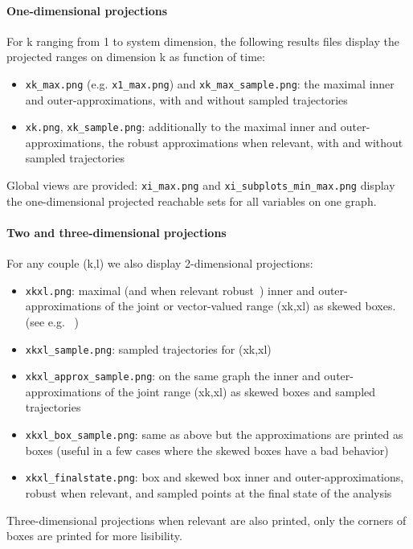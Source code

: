 \documentclass{article}
\begin{document}
\paragraph{One-dimensional projections}
For k ranging from 1 to system dimension, the following results files display the projected ranges on dimension k as function of time:
\begin{itemize}[noitemsep]
\item \texttt{xk\_max.png}  (e.g.  \texttt{x1\_max.png})  and \texttt{xk\_max\_sample.png}: the maximal inner and outer-approximations, with and without sampled trajectories
\item \texttt{xk.png},  \texttt{xk\_sample.png}: additionally to the maximal inner and outer-approximations, the robust approximations when relevant, with and without sampled trajectories
\end{itemize}
Global views are provided: \texttt{xi\_max.png} and \texttt{xi\_subplots\_min\_max.png} display the one-dimensional projected reachable sets for all variables on one graph. 

\paragraph{Two and three-dimensional projections}
For any couple (k,l) we also display 2-dimensional projections:
\begin{itemize}[noitemsep]
\item \texttt{xkxl.png}:  maximal (and when relevant robust~\cite{hscc19}) inner and outer-approximations of the joint or vector-valued range (xk,xl) as skewed boxes. (see e.g. ~\cite{lcss2020})
\item \texttt{xkxl\_sample.png}: sampled trajectories for (xk,xl) 
\item \texttt{xkxl\_approx\_sample.png}: on the same graph the inner and outer-approximations of the joint range (xk,xl) as skewed boxes and sampled trajectories
\item \texttt{xkxl\_box\_sample.png}: same as above but the approximations are printed as boxes (useful in a few cases where the skewed boxes have a bad behavior)
\item \texttt{xkxl\_finalstate.png}: box and skewed box inner and outer-approximations, robust when relevant, and sampled points at the final state of the analysis
\end{itemize}
Three-dimensional projections when relevant are also printed, only the corners of boxes are printed for more lisibility.
\end{document}
